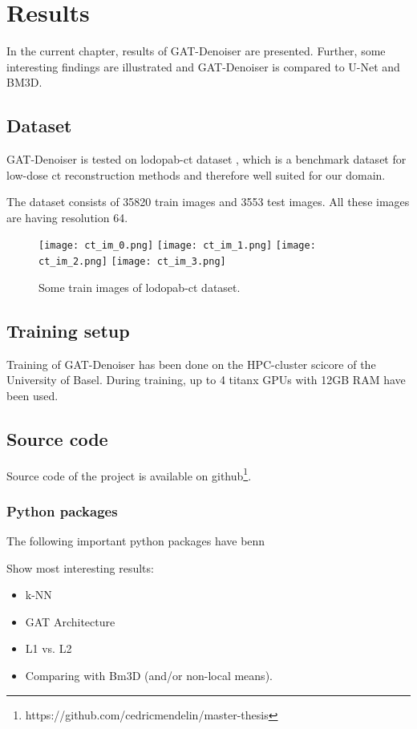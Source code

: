 \chapter{Results}
\label{sec:results}

In the current chapter, results of GAT-Denoiser are presented.
Further, some interesting findings are illustrated and GAT-Denoiser
is compared to U-Net and BM3D\cite{bm3d}.


\section{Dataset}
GAT-Denoiser is tested on lodopab-ct dataset \cite{lodopab-dataset}, which is a 
benchmark dataset for low-dose ct reconstruction methods and therefore well suited for our domain.

The dataset consists of 35820 train images and 3553 test images.
All these images are having resolution 64.

\begin{figure}[H]
  \centering
  \texttt{[image: ct\_im\_0.png]}
  \texttt{[image: ct\_im\_1.png]}
  \texttt{[image: ct\_im\_2.png]}
  \texttt{[image: ct\_im\_3.png]}
  \caption{Some train images of lodopab-ct dataset.}
\end{figure}



\section{Training setup}
Training of GAT-Denoiser has been done on the HPC-cluster scicore of the University of Basel.
During training, up to 4 titanx GPUs with 12GB RAM have been used.


\section{Source code}
Source code of the project is available on github\footnote{https://github.com/cedricmendelin/master-thesis}.

\subsection{Python packages}
The following important python packages have benn 




Show most interesting results:
\begin{itemize}
  \item k-NN
  \item GAT Architecture
  \item L1 vs. L2
  \item Comparing with Bm3D (and/or non-local means).
\end{itemize}
